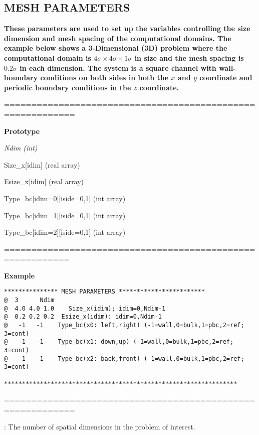 \documentclass[10pt,onecolumn]{article}
\begin{document}
\vfill
\break
\subsection{MESH PARAMETERS}
{\bf
These parameters are used to set up the variables controlling
the size dimension and mesh spacing of the computational domains.
The example below shows a 3-Dimensional (3D) problem where the
computational domain is $4\sigma \times 4\sigma \times 1\sigma$
in size and the mesh spacing is $0.2\sigma$ in each dimension.
The system is a square channel with wall-boundary conditions
on both sides in both the $x$ and $y$ coordinate and periodic
boundary conditions in the $z$ coordinate.}

\vspace{0.1in}
\noindent===========================================================

{\bf Prototype}

{\it Ndim (int)

Size\_x[idim] (real array)

Esize\_x[idim] (real array)

Type\_bc[idim=0][iside=0,1] (int array)

Type\_bc[idim=1][iside=0,1] (int array)

Type\_bc[idim=2][iside=0,1] (int array)
}

\noindent==========================================================


{\bf Example}

\begin{verbatim}
*************** MESH PARAMETERS ************************
@  3      Ndim
@  4.0 4.0 1.0    Size_x(idim); idim=0,Ndim-1
@  0.2 0.2 0.2  Esize_x(idim): idim=0,Ndim-1
@   -1   -1    Type_bc(x0: left,right) (-1=wall,0=bulk,1=pbc,2=ref; 3=cont)
@   -1   -1    Type_bc(x1: down,up) (-1=wall,0=bulk,1=pbc,2=ref; 3=cont)
@    1    1    Type_bc(x2: back,front) (-1=wall,0=bulk,1=pbc,2=ref; 3=cont)

*****************************************************************
\end{verbatim}

\noindent===========================================================
\vspace{0.1in}


\vspace{0.1in}
: The number of spatial dimensions in the problem of interest.
\end{document}
